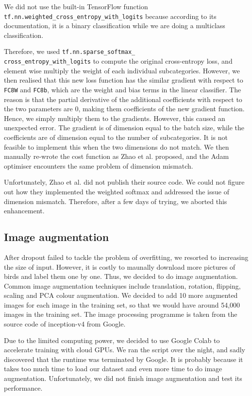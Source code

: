\documentclass[letterpaper, 12pt]{article}
\begin{document}
We did not use the built-in TensorFlow function \texttt{tf.nn.weighted\_cross\_entropy\_with\_logits} because according to its documentation, it
is a binary classification while we are doing a multiclass classification.

Therefore, we used \texttt{tf.nn.sparse\_softmax\_\\cross\_entropy\_with\_logits} to compute the original cross-entropy loss, and element wise multiply the
weight of each individual subcategories. However, we then realised that this new loss function has the similar gradient with respect to \texttt{FC8W} and
\texttt{FC8b}, which are the weight and bias terms in the linear classifier. The reason is that the partial derivative of the additional coefficients with
respect to the two parameters are 0, making them coefficients of the new gradient function. Hence, we simply multiply them to the gradients. However, this
caused an unexpected error. The gradient is of dimension equal to the batch size, while the coefficients are of dimension equal to the number of subcategories.
It is not feasible to implement this when the two dimensions do not match. We then manually re-wrote the cost function as Zhao et al. \cite{Zhao} proposed,
and the Adam optimiser encounters the same problem of dimension mismatch.

Unfortunately, Zhao et al. \cite{Zhao} did not publish their source code. We could not figure out how they implemented the weighted softmax and addressed the
issue of dimension mismatch. Therefore, after a few days of trying, we aborted this enhancement.

\subsection{Image augmentation}
After dropout failed to tackle the problem of overfitting, we resorted to increasing the size of input. However, it is costly to maunally download more pictures
of birds and label them one by one. Thus, we decided to do image augmentation. Common image augmentation techniques include translation, rotation, flipping, scaling
and PCA colour augmentation. We decided to add 10 more augmented images for each image in the training set, so that we would have around 54,000 images in the
training set. The image processing programme is taken from the source code of inception-v4 from Google.

Due to the limited computing power, we decided to use Google Colab to accelerate training with cloud GPUs. We ran the script over the night, and sadly discovered
that the runtime was terminated by Google. It is probably because it takes too much time to load our dataset and even more time to do image augmentation. Unfortunately,
we did not finish image augmentation and test its performance.
\end{document}
